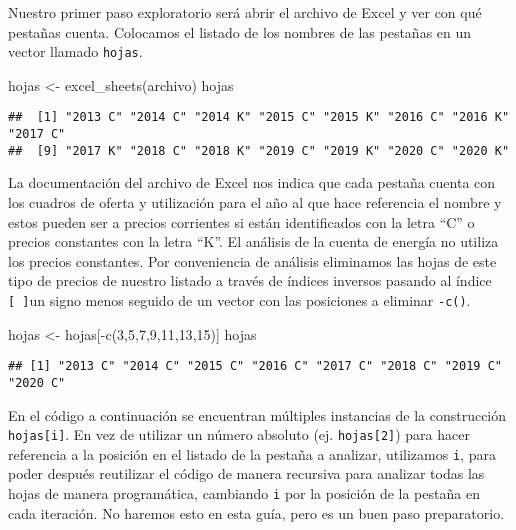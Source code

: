 \documentclass[
]{article}
\newenvironment{Shaded}{\begin{snugshade}}{\end{snugshade}}
\newcommand{\DecValTok}[1]{\textcolor[rgb]{0.00,0.00,0.81}{#1}}
\newcommand{\FunctionTok}[1]{\textcolor[rgb]{0.00,0.00,0.00}{#1}}
\newcommand{\NormalTok}[1]{#1}
\newcommand{\OtherTok}[1]{\textcolor[rgb]{0.56,0.35,0.01}{#1}}
\newcommand{\SpecialCharTok}[1]{\textcolor[rgb]{0.00,0.00,0.00}{#1}}
\begin{document}
Nuestro primer paso exploratorio será abrir el archivo de Excel y ver
con qué pestañas cuenta. Colocamos el listado de los nombres de las
pestañas en un vector llamado \texttt{hojas}.

\begin{Shaded}
\begin{Highlighting}[]
\NormalTok{hojas }\OtherTok{\textless{}{-}} \FunctionTok{excel\_sheets}\NormalTok{(archivo)}
\NormalTok{hojas}
\end{Highlighting}
\end{Shaded}

\begin{verbatim}
##  [1] "2013 C" "2014 C" "2014 K" "2015 C" "2015 K" "2016 C" "2016 K" "2017 C"
##  [9] "2017 K" "2018 C" "2018 K" "2019 C" "2019 K" "2020 C" "2020 K"
\end{verbatim}

La documentación del archivo de Excel nos indica que cada pestaña cuenta
con los cuadros de oferta y utilización para el año al que hace
referencia el nombre y estos pueden ser a precios corrientes si están
identificados con la letra ``C'' o precios constantes con la letra
``K''. El análisis de la cuenta de energía no utiliza los precios
constantes. Por conveniencia de análisis eliminamos las hojas de este
tipo de precios de nuestro listado a través de índices inversos pasando
al índice \texttt{{[}\ {]}}un signo menos seguido de un vector con las
posiciones a eliminar \texttt{-c()}.

\begin{Shaded}
\begin{Highlighting}[]
\NormalTok{hojas }\OtherTok{\textless{}{-}}\NormalTok{ hojas[}\SpecialCharTok{{-}}\FunctionTok{c}\NormalTok{(}\DecValTok{3}\NormalTok{,}\DecValTok{5}\NormalTok{,}\DecValTok{7}\NormalTok{,}\DecValTok{9}\NormalTok{,}\DecValTok{11}\NormalTok{,}\DecValTok{13}\NormalTok{,}\DecValTok{15}\NormalTok{)]}
\NormalTok{hojas}
\end{Highlighting}
\end{Shaded}

\begin{verbatim}
## [1] "2013 C" "2014 C" "2015 C" "2016 C" "2017 C" "2018 C" "2019 C" "2020 C"
\end{verbatim}

En el código a continuación se encuentran múltiples instancias de la
construcción \texttt{hojas{[}i{]}}. En vez de utilizar un número
absoluto (ej. \texttt{hojas{[}2{]}}) para hacer referencia a la posición
en el listado de la pestaña a analizar, utilizamos \texttt{i}, para
poder después reutilizar el código de manera recursiva para analizar
todas las hojas de manera programática, cambiando \texttt{i} por la
posición de la pestaña en cada iteración. No haremos esto en esta guía,
pero es un buen paso preparatorio.
\end{document}
